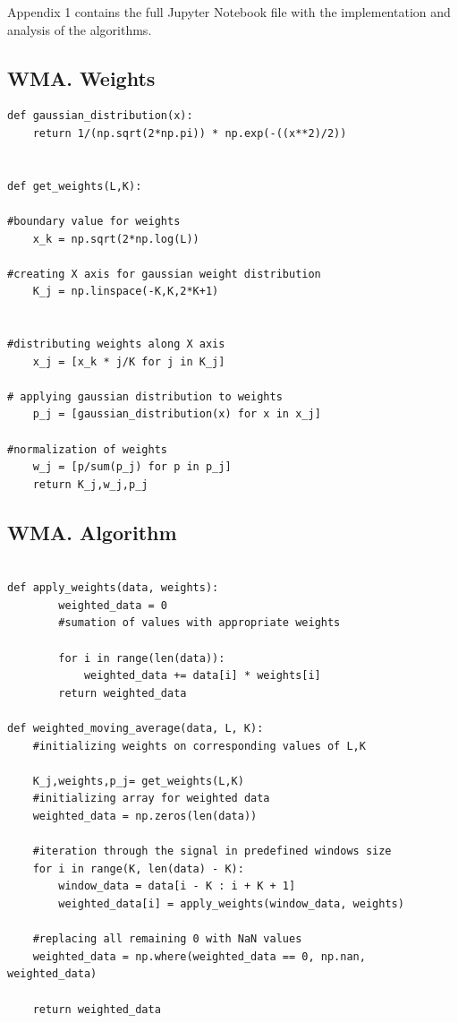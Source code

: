 \documentclass[a4paper,12pt,fleqn]{article}
\begin{document}
Appendix 1 contains the full Jupyter Notebook file with the implementation and analysis of the algorithms. 

        \subsection{WMA. Weights}
        \begin{verbatim}
def gaussian_distribution(x):
    return 1/(np.sqrt(2*np.pi)) * np.exp(-((x**2)/2))      
    
    
def get_weights(L,K):

#boundary value for weights
    x_k = np.sqrt(2*np.log(L))

#creating X axis for gaussian weight distribution
    K_j = np.linspace(-K,K,2*K+1)


#distributing weights along X axis
    x_j = [x_k * j/K for j in K_j]

# applying gaussian distribution to weights
    p_j = [gaussian_distribution(x) for x in x_j]

#normalization of weights
    w_j = [p/sum(p_j) for p in p_j]
    return K_j,w_j,p_j
        \end{verbatim}
\newpage
        \subsection{WMA. Algorithm}
        \begin{verbatim}

def apply_weights(data, weights):
        weighted_data = 0
        #sumation of values with appropriate weights
        
        for i in range(len(data)):
            weighted_data += data[i] * weights[i]
        return weighted_data

def weighted_moving_average(data, L, K):
    #initializing weights on corresponding values of L,K
    
    K_j,weights,p_j= get_weights(L,K)
    #initializing array for weighted data
    weighted_data = np.zeros(len(data))
    
    #iteration through the signal in predefined windows size
    for i in range(K, len(data) - K):
        window_data = data[i - K : i + K + 1]
        weighted_data[i] = apply_weights(window_data, weights)
    
    #replacing all remaining 0 with NaN values
    weighted_data = np.where(weighted_data == 0, np.nan, weighted_data)
    
    return weighted_data
            \end{verbatim}
\end{document}
